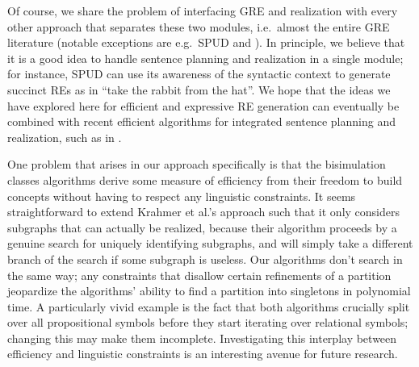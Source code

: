 Of course, we share the problem of interfacing GRE and realization
with every other approach that separates these two modules, i.e.\
almost the entire GRE literature (notable exceptions are e.g.\ SPUD
\cite{Stone2003a} and \newcite{Horacek1997}).  In principle, we
believe that it is a good idea to handle sentence planning and
realization in a single module; for instance, SPUD can use its
awareness of the syntactic context to generate succinct REs as in
``take the rabbit from the hat''.  We hope that the ideas we have
explored here for efficient and expressive RE generation can
eventually be combined with recent efficient algorithms for integrated
sentence planning and realization, such as in \newcite{KolSto07}.

One problem that arises in our approach specifically is that the
bisimulation classes algorithms derive some measure of efficiency from
their freedom to build concepts without having to respect any
linguistic constraints.  It seems straightforward to extend Krahmer et
al.'s \shortcite{Krahmer2003} approach such that it only considers
subgraphs that can actually be realized, because their algorithm
proceeds by a genuine search for uniquely identifying subgraphs, and
will simply take a different branch of the search if some subgraph is
useless.  Our algorithms don't search in the same way; any constraints
that disallow certain refinements of a partition jeopardize the
algorithms' ability to find a partition into singletons in polynomial
time.  A particularly vivid example is the fact that both algorithms
crucially split over all propositional symbols before they start
iterating over relational symbols; changing this may make them
incomplete.  Investigating this interplay between efficiency and
linguistic constraints is an interesting avenue for future research.




